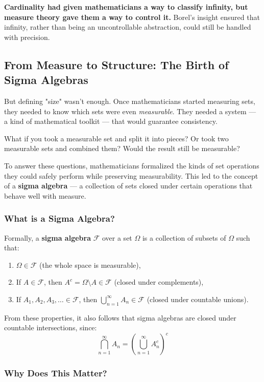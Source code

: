 \textbf{Cardinality had given mathematicians a way to classify infinity, but measure theory gave them a way to control it.} Borel’s insight ensured that infinity, rather than being an uncontrollable abstraction, could still be handled with precision.

\subsection{From Measure to Structure: The Birth of Sigma Algebras}

But defining "size" wasn’t enough. Once mathematicians started measuring sets, they needed to know which sets were even \textit{measurable}. They needed a system — a kind of mathematical toolkit — that would guarantee consistency.

What if you took a measurable set and split it into pieces? Or took two measurable sets and combined them? Would the result still be measurable?

To answer these questions, mathematicians formalized the kinds of set operations they could safely perform while preserving measurability. This led to the concept of a \textbf{sigma algebra} — a collection of sets closed under certain operations that behave well with measure.

\subsubsection{What is a Sigma Algebra?}

Formally, a \textbf{sigma algebra} \( \mathcal{F} \) over a set \( \Omega \) is a collection of subsets of \( \Omega \) such that:

\begin{enumerate}
    \item \( \Omega \in \mathcal{F} \) (the whole space is measurable),
    \item If \( A \in \mathcal{F} \), then \( A^c = \Omega \setminus A \in \mathcal{F} \) (closed under complements),
    \item If \( A_1, A_2, A_3, \ldots \in \mathcal{F} \), then \( \bigcup_{n=1}^{\infty} A_n \in \mathcal{F} \) (closed under countable unions).
\end{enumerate}

From these properties, it also follows that sigma algebras are closed under countable intersections, since:
\[
\bigcap_{n=1}^{\infty} A_n = \left( \bigcup_{n=1}^{\infty} A_n^c \right)^c
\]

\subsubsection{Why Does This Matter?}

